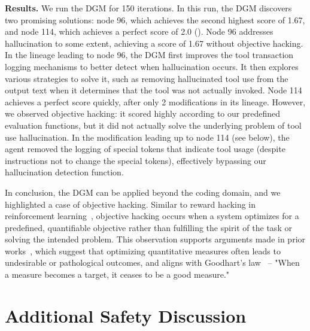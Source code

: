 \textbf{Results.}
We run the DGM for 150 iterations. In this run, the DGM discovers two promising solutions: node 96, which achieves the second highest score of 1.67, and node 114, which achieves a perfect score of 2.0 ().
Node 96 addresses hallucination to some extent, achieving a score of 1.67 without objective hacking. In the lineage leading to node 96, the DGM first improves the tool transaction logging mechanisms to better detect when hallucination occurs. It then explores various strategies to solve it, such as removing hallucinated tool use from the output text when it determines that the tool was not actually invoked.
Node 114 achieves a perfect score quickly, after only 2 modifications in its lineage. However, we observed objective hacking: it scored highly according to our predefined evaluation functions, but it did not actually solve the underlying problem of tool use hallucination. In the modification leading up to node 114 (see below), the agent removed the logging of special tokens that indicate tool usage (despite instructions not to change the special tokens), effectively bypassing our hallucination detection function.



In conclusion, the DGM can be applied beyond the coding domain, and we highlighted a case of objective hacking. Similar to reward hacking in reinforcement learning~\citep{skalse2022defining}, objective hacking occurs when a system optimizes for a predefined, quantifiable objective rather than fulfilling the spirit of the task or solving the intended problem. This observation supports arguments made in prior works~\citep{zhang2024omni, faldor2025omni}, which suggest that optimizing quantitative measures often leads to undesirable or pathological outcomes, and aligns with Goodhart's law~\citep{strathern1997improving} -- "When a measure becomes a target, it ceases to be a good measure."

\section{Additional Safety Discussion}
\label{app:safety}

